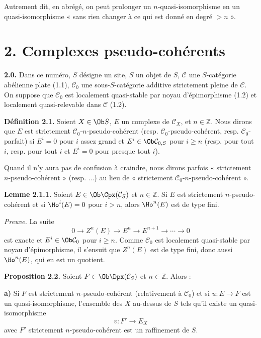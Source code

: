 \documentclass[11pt]{article}
\begin{document}
Autrement dit, en abrégé, on peut prolonger un \(n\)-quasi-isomorphisme en un quasi-isomorphisme « sans rien changer à ce qui est donné en degré \(>n\) ».

\section*{2. Complexes pseudo-cohérents}

\textbf{2.0.} Dans ce numéro, \(S\) désigne un site, \(S\) un objet de \(S\), \(\mathcal C\) une \(S\)-catégorie abélienne plate (1.1), \(\mathcal C_0\) une sous-\(S\)-catégorie additive strictement pleine de \(\mathcal C\). On suppose que \(\mathcal C_0\) est localement quasi-stable par noyau d'épimorphisme (1.2) et localement quasi-relevable dans \(\mathcal C\) (1.2).

\textbf{Définition 2.1.} Soient \(X\in\Ob S\), \(E\) un complexe de \(\mathcal C_X\), et \(n\in\mathbb Z\). Nous dirons que \(E\) est strictement \(\mathcal C_0\)-\(n\)-pseudo-cohérent (resp. \(\mathcal C_0\)-pseudo-cohérent, resp. \(\mathcal C_0\)-parfait) si \(E^i=0\) pour \(i\) assez grand et \(E^i\in\Ob\mathcal C_{0,S}\) pour \(i\geq n\) (resp. pour tout \(i\), resp. pour tout \(i\) et \(E^i=0\) pour presque tout \(i\)).

Quand il n'y aura pas de confusion à craindre, nous dirons parfois « strictement \(n\)-pseudo-cohérent » (resp. ...) au lieu de « strictement \(\mathcal C_0\)-\(n\)-pseudo-cohérent ».

\textbf{Lemme 2.1.1.} Soient \(E\in\Ob\Cpx(\mathcal C_S)\) et \(n\in\mathbb Z\). Si \(E\) est strictement \(n\)-pseudo-cohérent et si \(\Ho^i(E)=0\) pour \(i>n\), alors \(\Ho^n(E)\) est de type fini.

\emph{Preuve.} La suite
\[
  0\longrightarrow Z^n(E)\longrightarrow E^n\longrightarrow E^{n+1}\longrightarrow\cdots\longrightarrow 0
\]
est exacte et \(E^i\in\Ob\mathcal C_0\) pour \(i\geq n\). Comme \(\mathcal C_0\) est localement quasi-stable par noyau d'épimorphisme, il s'ensuit que \(Z^n(E)\) est de type fini, donc aussi \(\Ho^n(E)\), qui en est un quotient.

\textbf{Proposition 2.2.} Soient \(F\in\Ob\Dpx(\mathcal C_S)\) et \(n\in\mathbb Z\). Alors :

\textbf{a)} Si \(F\) est strictement \(n\)-pseudo-cohérent (relativement à \(\mathcal C_0\)) et si \(u:E\to F\) est un quasi-isomorphisme, l'ensemble des \(X\) au-dessus de \(S\) tels qu'il existe un quasi-isomorphisme
\[
  v:F'\longrightarrow E_X
\]
avec \(F'\) strictement \(n\)-pseudo-cohérent est un raffinement de \(S\).
\end{document}
